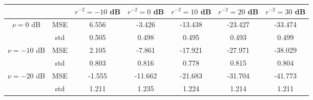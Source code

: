 \begin{tabular}{ccccccc}
\toprule
             &     &  $r^{-2}=-10$ dB &  $r^{-2}=0$ dB &  $r^{-2}=10$ dB &  $r^{-2}=20$ dB &  $r^{-2}=30$ dB \\
\midrule
$\nu=0$ dB & MSE &            6.556 &         -3.426 &         -13.438 &         -23.427 &         -33.474 \\
             & std &            0.505 &          0.498 &           0.495 &           0.493 &           0.499 \\ \hline
$\nu=-10$ dB & MSE &            2.105 &         -7.861 &         -17.921 &         -27.971 &         -38.029 \\
             & std &            0.803 &          0.816 &           0.778 &           0.815 &           0.804 \\ \hline
$\nu=-20$ dB & MSE &           -1.555 &        -11.662 &         -21.683 &         -31.704 &         -41.773 \\
             & std &            1.211 &          1.235 &           1.224 &           1.214 &           1.211 \\
\bottomrule
\end{tabular}
